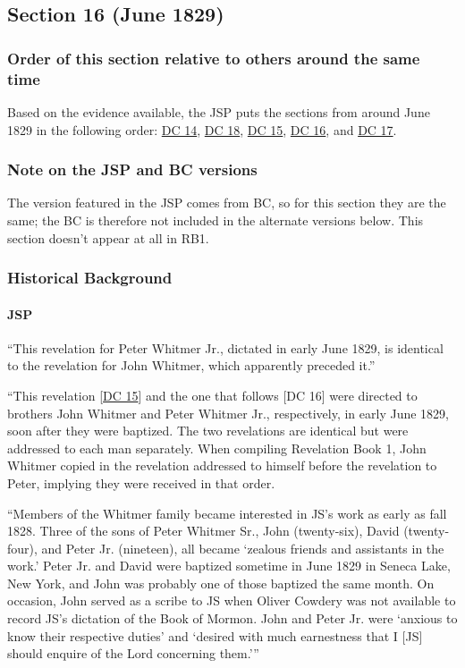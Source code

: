 \subsection{Section 16 (June 1829)}
	\label{DC16}
	
	\subsubsection{Order of this section relative to others around the same time}
	
		Based on the evidence available, the JSP puts the sections from around June 1829 in the following order: \hyperref[DC14]{DC 14}, \hyperref[DC18]{DC 18}, \hyperref[DC15]{DC 15}, \hyperref[DC16]{DC 16}, and \hyperref[DC17]{DC 17}.
	
	\subsubsection{Note on the JSP and BC versions}
	
		The version featured in the JSP comes from BC, so for this section they are the same; the BC is therefore not included in the alternate versions below. This section doesn't appear at all in RB1.
	
	\subsubsection{Historical Background}
		\label{DC16-HB}
		
		\paragraph{JSP}
		
			``This revelation for Peter Whitmer Jr., dictated in early June 1829, is identical to the revelation for John Whitmer, which apparently preceded it.''
		
			``This revelation [\hyperref[DC15]{DC 15}] and the one that follows [DC 16] were directed to brothers John Whitmer and Peter Whitmer Jr., respectively, in early June 1829, soon after they were baptized. The two revelations are identical but were addressed to each man separately. When compiling Revelation Book 1, John Whitmer copied in the revelation addressed to himself before the revelation to Peter, implying they were received in that order.
			
			``Members of the Whitmer family became interested in JS's work as early as fall 1828. Three of the sons of Peter Whitmer Sr., John (twenty-six), David (twenty-four), and Peter Jr. (nineteen), all became `zealous friends and assistants in the work.' Peter Jr. and David were baptized sometime in June 1829 in Seneca Lake, New York, and John was probably one of those baptized the same month. On occasion, John served as a scribe to JS when Oliver Cowdery was not available to record JS's dictation of the Book of Mormon. John and Peter Jr. were `anxious to know their respective duties' and `desired with much earnestness that I [JS] should enquire of the Lord concerning them.'''
				
